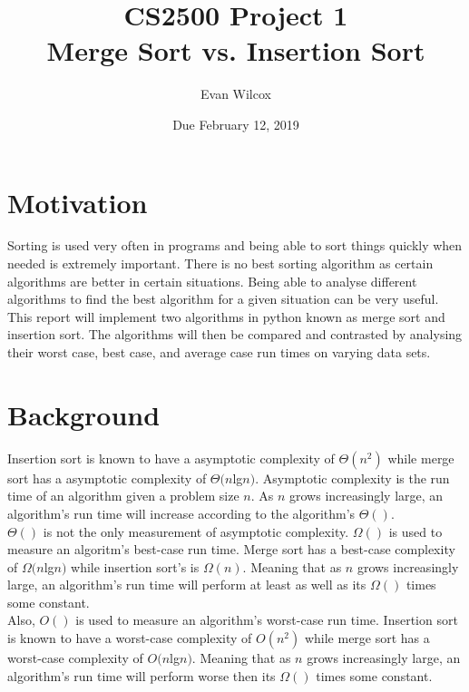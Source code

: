 \documentclass[a4paper]{article}
\title{CS2500 Project 1\\ Merge Sort vs. Insertion Sort}
\author{Evan Wilcox}
\date{Due February 12, 2019}
\begin{document}
    \maketitle

    \section{Motivation}
    Sorting is used very often in programs and being able to sort things quickly 
    when needed is extremely important. There is no best sorting algorithm as certain
    algorithms are better in certain situations. Being able to analyse different 
    algorithms to find the best algorithm for a given situation can be very useful.\\

    This report will implement two algorithms in python known as merge sort and 
    insertion sort. The algorithms will then be compared and contrasted by analysing 
    their worst case, best case, and average case run times on varying data sets.


    \section{Background}
    Insertion sort is known to have a asymptotic complexity of $\Theta(n^{2})$ while merge 
    sort has a asymptotic  complexity of $\Theta(n$lg$n)$. Asymptotic  complexity 
    is the run time of an algorithm given a problem size $n$. As $n$ grows increasingly 
    large, an algorithm's run time will increase according to the algorithm's $\Theta()$. \\

    $\Theta()$ is not the only measurement of asymptotic complexity. $\Omega()$ is used to 
    measure an algoritm's best-case run time. Merge sort has a best-case complexity of
    $\Omega(n$lg$n)$ while insertion sort's is $\Omega(n)$. Meaning that as $n$ grows
    increasingly large, an algorithm's run time will perform at least as well as its
    $\Omega()$ times some constant. \\

    Also, $O()$ is used to measure an algorithm's worst-case run time. Insertion sort 
    is known to have a worst-case complexity of $O(n^{2})$ while merge sort has a 
    worst-case complexity of $O(n$lg$n)$. Meaning that as $n$ grows
    increasingly large, an algorithm's run time will perform worse then its $\Omega()$ 
    times some constant. \\
\end{document}
